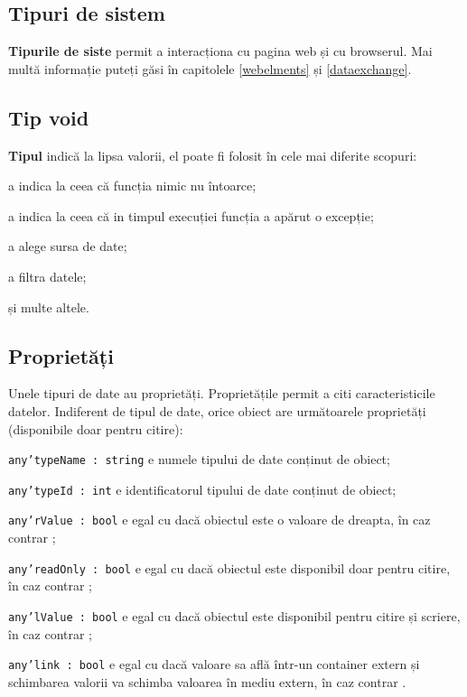 \subsection{Tipuri de sistem}

{\bf Tipurile de siste} permit a interacționa cu pagina web și cu browserul. Mai multă informație puteți găsi în capitolele \ref{webelments} și \ref{dataexchange}.

\subsection{Tip void}

{\bf Tipul \void{}} indică la lipsa valorii, el poate fi folosit în cele mai diferite scopuri:

\begin{icItems}
\item
	a indica la ceea că funcția nimic nu întoarce;
\item
	a indica la ceea că in timpul execuției funcția a apărut o excepție;
\item
	a alege sursa de date;
\item
	a filtra datele;
\item
	și multe altele.
\end{icItems}


\subsection{Proprietăți}

Unele tipuri de date au proprietăți. Proprietățile permit a citi caracteristicile datelor. Indiferent de tipul de date, orice obiect are următoarele proprietăți (disponibile doar pentru citire):

\begin{icItems}
\item
	\texttt{any'typeName : string} e numele tipului de date conținut de obiect;
\item
	\texttt{any'typeId : int} e identificatorul tipului de date conținut de obiect;
\item
	\texttt{any'rValue : bool} e egal cu \true{} dacă obiectul este o valoare de dreapta, în caz contrar \false{};
\item
	\texttt{any'readOnly : bool} e egal cu \true{} dacă obiectul este disponibil doar pentru citire, în caz contrar \false{};
\item
	\texttt{any'lValue : bool} e egal cu \true{} dacă obiectul este disponibil pentru citire și scriere, în caz contrar \false{};
\item
	\texttt{any'link : bool} e egal cu \true{} dacă valoare sa află într-un container extern și schimbarea valorii va schimba valoarea în mediu extern, în caz contrar \false{}.
\end{icItems}

